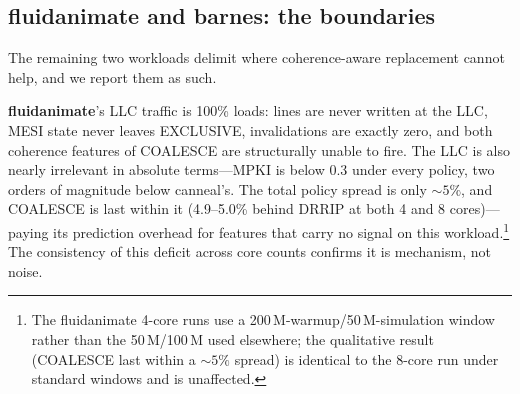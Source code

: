 \documentclass[conference]{IEEEtran}
\begin{document}
\begin{table}[htbp]
    \centering
    \renewcommand{\arraystretch}{1.15}
    \caption{ocean total cycles (lower is better)}
    \label{tab:ocean}
\end{table}

\subsection{fluidanimate and barnes: the boundaries}
\label{sec:boundaries}

The remaining two workloads delimit where coherence-aware replacement cannot help, and we report them as such.

\textbf{fluidanimate}'s LLC traffic is 100\% loads: lines are never written at the LLC, MESI state never leaves EXCLUSIVE, invalidations are exactly zero, and both coherence features of COALESCE are structurally unable to fire. The LLC is also nearly irrelevant in absolute terms---MPKI is below 0.3 under every policy, two orders of magnitude below canneal's. The total policy spread is only ${\sim}5\%$, and COALESCE is last within it (4.9--5.0\% behind DRRIP at both 4 and 8 cores)---paying its prediction overhead for features that carry no signal on this workload.\footnote{The fluidanimate 4-core runs use a 200\,M-warmup/50\,M-simulation window rather than the 50\,M/100\,M used elsewhere; the qualitative result (COALESCE last within a ${\sim}5\%$ spread) is identical to the 8-core run under standard windows and is unaffected.} The consistency of this deficit across core counts confirms it is mechanism, not noise.
\end{document}
